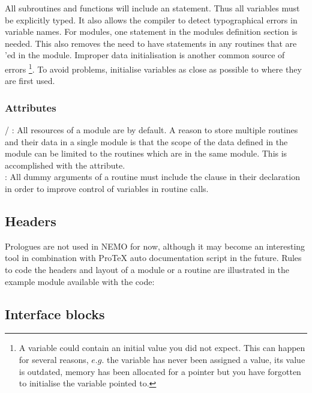 \documentclass{article}
\begin{document}
All subroutines and functions will include an  statement.
Thus all variables must be explicitly typed.
It also allows the compiler to detect typographical errors in variable names.
For modules, one  statement in the modules definition section is needed.
This also removes the need to have  statements in
any routines that are 'ed in the module.
Improper data initialisation is another common source of errors
\footnote{
  A variable could contain an initial value you did not expect.
  This can happen for several reasons, $e.g.$ the variable has never been assigned a value, its value is outdated,
  memory has been allocated for a pointer but you have forgotten to initialise the variable pointed to.
}.
To avoid problems, initialise variables as close as possible to where they are first used.

\subsubsection{Attributes}

 / :
All resources of a module are  by default.
A reason to store multiple routines and their data in a single module is that
the scope of the data defined in the module can be limited to the routines which are in the same module.
This is accomplished with the  attribute. \\
:
All dummy arguments of a routine must include the  clause in their declaration in order to
improve control of variables in routine calls.

\subsection{Headers}

Prologues are not used in NEMO for now, although it may become an interesting tool in combination with
ProTeX auto documentation script in the future.
Rules to code the headers and layout of a module or a routine are illustrated in the example module available with
the code: 

\subsection{Interface blocks}
\end{document}
